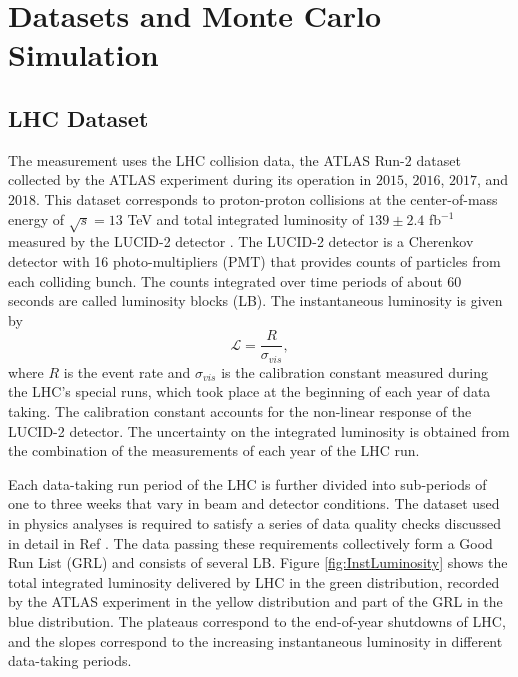 \section{Datasets and Monte Carlo Simulation}
\label{sec:DataSetAndMonteCarlo}

\subsection{LHC Dataset}
\label{subsec:Dataset}

The measurement uses the LHC collision data, the ATLAS Run-$2$ dataset collected by the ATLAS experiment during its operation in $2015$, $2016$, $2017$, and $2018$. This dataset corresponds to proton-proton collisions at the center-of-mass energy of $\sqrt{s} = 13$ TeV and total integrated luminosity of $139 \pm 2.4$ fb$^{-1}$ measured by the LUCID-2 detector \cite{ATLASLuminosityDetector}\cite{ATLASRun2IntegratedLumi}. The LUCID-2 detector is a Cherenkov detector with 16 photo-multipliers (PMT) that provides counts of particles from each colliding bunch. The counts integrated over time periods of about $60$ seconds are called luminosity blocks (LB). The instantaneous luminosity is given by 
\begin{equation}
  \mathcal{L} = \frac{R}{\sigma_{vis}},
\end{equation}
where $R$ is the event rate and $\sigma_{vis}$ is the calibration constant measured during the LHC's special runs, which took place at the beginning of each year of data taking. The calibration constant accounts for the non-linear response of the LUCID-2 detector. The uncertainty on the integrated luminosity is obtained from the combination of the measurements of each year of the LHC run.

Each data-taking run period of the LHC is further divided into sub-periods of one to three weeks that vary in beam and detector conditions. The dataset used in physics analyses is required to satisfy a series of data quality checks discussed in detail in Ref \cite{ATLASRun2DataTaking}. The data passing these requirements collectively form a Good Run List (GRL) and consists of several LB. Figure \ref{fig:InstLuminosity} shows the total integrated luminosity delivered by LHC in the green distribution, recorded by the ATLAS experiment in the yellow distribution and part of the GRL in the blue distribution. The plateaus correspond to the end-of-year shutdowns of LHC, and the slopes correspond to the increasing instantaneous luminosity in different data-taking periods. 

